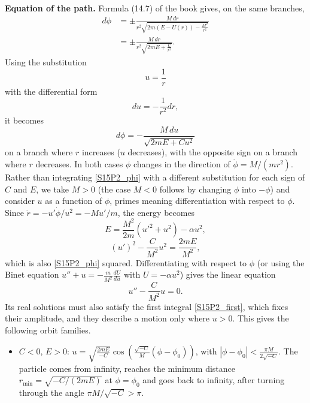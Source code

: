 \begin{problem}[title={Motion in an inverse-cube attractive force}]
{\vspace{2ex}\textbf{Equation of the path.} Formula (14.7) of the book gives, on the same branches,
\begin{align*}
    d\phi &= \pm\frac{M\,dr}{r^2\sqrt{2m\left(E-U(r)\right)-\frac{M^2}{r^2}}} \\
    &= \pm\frac{M\,dr}{r^2\sqrt{2mE+\frac{C}{r^2}}}.
\end{align*}
Using the substitution
\begin{equation*}
    u = \frac{1}{r}
\end{equation*}
with the differential form
\begin{equation*}
    du = -\frac{1}{r^2}dr,
\end{equation*}
it becomes
\begin{equation} \label{S15P2_phi}
    d\phi = -\frac{M\,du}{\sqrt{2mE + Cu^2}}
\end{equation}
on a branch where $r$ increases ($u$ decreases), with the opposite sign on a branch where $r$ decreases. In both cases $\phi$ changes in the direction of $\Dot{\phi} = M/(mr^2)$. Rather than integrating \eqref{S15P2_phi} with a different substitution for each sign of $C$ and $E$, we take $M>0$ (the case $M<0$ follows by changing $\phi$ into $-\phi$) and consider $u$ as a function of $\phi$, primes meaning differentiation with respect to $\phi$. Since $\Dot{r} = -u'\Dot{\phi}/u^2 = -Mu'/m$, the energy becomes
\begin{equation*}
    E = \frac{M^2}{2m}\left(u'^2+u^2\right) - \alpha u^2,
\end{equation*}
\ie
\begin{equation} \label{S15P2_first}
    (u')^2 - \frac{C}{M^2}u^2 = \frac{2mE}{M^2},
\end{equation}
which is also \eqref{S15P2_phi} squared. Differentiating with respect to $\phi$ (or using the Binet equation $u''+u = -\frac{m}{M^2}\frac{dU}{du}$ with $U = -\alpha u^2$) gives the linear equation
\begin{equation*}
    u'' - \frac{C}{M^2}u = 0 .
\end{equation*}
Its real solutions must also satisfy the first integral \eqref{S15P2_first}, which fixes their amplitude, and they describe a motion only where $u>0$. This gives the following orbit families.
\begin{itemize}
    \item $C<0$, $E>0$: $u = \sqrt{\frac{2mE}{-C}}\cos{\left(\frac{\sqrt{-C}}{M}(\phi-\phi_0)\right)}$, with $|\phi-\phi_0| < \frac{\pi M}{2\sqrt{-C}}$. The particle comes from infinity, reaches the minimum distance $r_{\text{min}} = \sqrt{-C/(2mE)}$ at $\phi = \phi_0$ and goes back to infinity, after turning through the angle $\pi M/\sqrt{-C} > \pi$.

\end{itemize}}
\end{problem}
